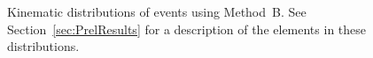 \documentclass[12pt,twoside,letterpaper,doublespace]{article}
\begin{document}
\begin{figure}[h!]
 \centering
\caption[Method B \phoonejet]{Kinematic distributions of \phoonejet events using \mbox{Method B}. See Section~\ref{sec:PrelResults} for a description of the elements in these distributions.}
\subfigure[]

\end{figure}
\end{document}

